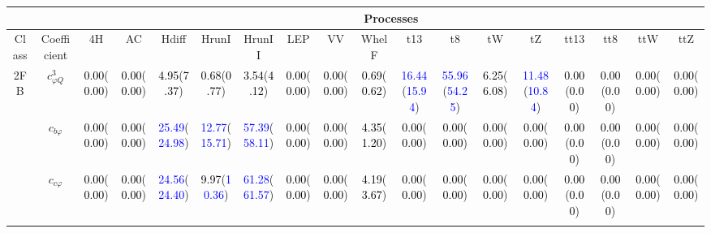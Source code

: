 \documentclass{article}
\begin{document}
\begin{landscape}
\begin{table}[H]
\scriptsize
\centering
\begin{tabular}{|c|c|c|c|c|c|c|c|c|c|c|c|c|c|c|c|c|c|}
\hline
\multicolumn{2}{|c|}{}                 & \multicolumn{16}{c|}{Processes} \\ \hline
 Class & Coefficient & {\rm 4H }& {\rm AC }& {\rm Hdiff }& {\rm HrunI }& {\rm HrunII }& {\rm LEP }& {\rm VV }& {\rm WhelF }& {\rm t13 }& {\rm t8 }& {\rm tW }& {\rm tZ }& {\rm tt13 }& {\rm tt8 }& {\rm ttW }& {\rm ttZ }\\ \hline
\multirow{10}{*}{2FB}
 & $c_{\varphi Q}^{3}$ & \textcolor{black}{0.00}(\textcolor{black}{0.00}) & \textcolor{black}{0.00}(\textcolor{black}{0.00}) & \textcolor{black}{4.95}(\textcolor{black}{7.37}) & \textcolor{black}{0.68}(\textcolor{black}{0.77}) & \textcolor{black}{3.54}(\textcolor{black}{4.12}) & \textcolor{black}{0.00}(\textcolor{black}{0.00}) & \textcolor{black}{0.00}(\textcolor{black}{0.00}) & \textcolor{black}{0.69}(\textcolor{black}{0.62}) & \textcolor{blue}{16.44}(\textcolor{blue}{15.94}) & \textcolor{blue}{55.96}(\textcolor{blue}{54.25}) & \textcolor{black}{6.25}(\textcolor{black}{6.08}) & \textcolor{blue}{11.48}(\textcolor{blue}{10.84}) & \textcolor{black}{0.00}(\textcolor{black}{0.00}) & \textcolor{black}{0.00}(\textcolor{black}{0.00}) & \textcolor{black}{0.00}(\textcolor{black}{0.00}) & \textcolor{black}{0.00}(\textcolor{black}{0.00})\\ \cline{2-18}
 & $c_{b \varphi}$ & \textcolor{black}{0.00}(\textcolor{black}{0.00}) & \textcolor{black}{0.00}(\textcolor{black}{0.00}) & \textcolor{blue}{25.49}(\textcolor{blue}{24.98}) & \textcolor{blue}{12.77}(\textcolor{blue}{15.71}) & \textcolor{blue}{57.39}(\textcolor{blue}{58.11}) & \textcolor{black}{0.00}(\textcolor{black}{0.00}) & \textcolor{black}{0.00}(\textcolor{black}{0.00}) & \textcolor{black}{4.35}(\textcolor{black}{1.20}) & \textcolor{black}{0.00}(\textcolor{black}{0.00}) & \textcolor{black}{0.00}(\textcolor{black}{0.00}) & \textcolor{black}{0.00}(\textcolor{black}{0.00}) & \textcolor{black}{0.00}(\textcolor{black}{0.00}) & \textcolor{black}{0.00}(\textcolor{black}{0.00}) & \textcolor{black}{0.00}(\textcolor{black}{0.00}) & \textcolor{black}{0.00}(\textcolor{black}{0.00}) & \textcolor{black}{0.00}(\textcolor{black}{0.00})\\ \cline{2-18}
 & $c_{c \varphi}$ & \textcolor{black}{0.00}(\textcolor{black}{0.00}) & \textcolor{black}{0.00}(\textcolor{black}{0.00}) & \textcolor{blue}{24.56}(\textcolor{blue}{24.40}) & \textcolor{black}{9.97}(\textcolor{blue}{10.36}) & \textcolor{blue}{61.28}(\textcolor{blue}{61.57}) & \textcolor{black}{0.00}(\textcolor{black}{0.00}) & \textcolor{black}{0.00}(\textcolor{black}{0.00}) & \textcolor{black}{4.19}(\textcolor{black}{3.67}) & \textcolor{black}{0.00}(\textcolor{black}{0.00}) & \textcolor{black}{0.00}(\textcolor{black}{0.00}) & \textcolor{black}{0.00}(\textcolor{black}{0.00}) & \textcolor{black}{0.00}(\textcolor{black}{0.00}) & \textcolor{black}{0.00}(\textcolor{black}{0.00}) & \textcolor{black}{0.00}(\textcolor{black}{0.00}) & \textcolor{black}{0.00}(\textcolor{black}{0.00}) & \textcolor{black}{0.00}(\textcolor{black}{0.00})\\ \cline{2-18}

\end{tabular}
\end{table}
\end{landscape}
\end{document}
